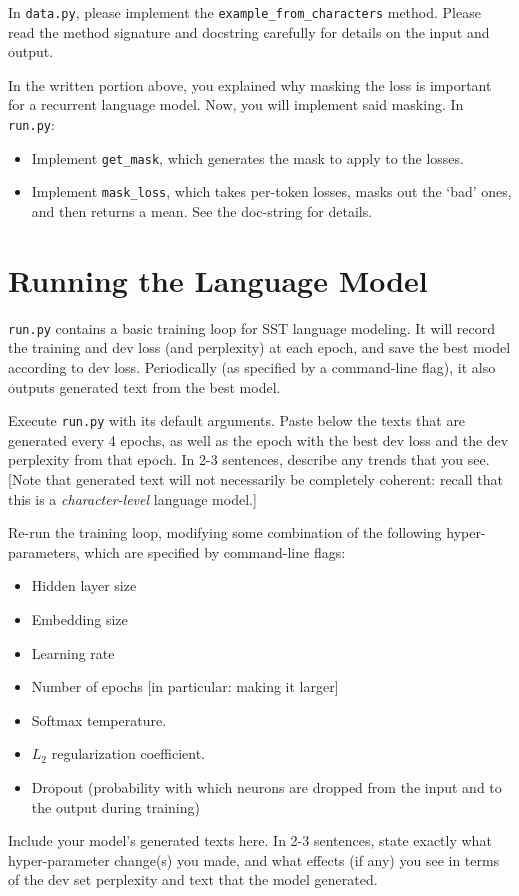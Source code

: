 \documentclass[11pt]{article}
\begin{document}
\noindent In \texttt{data.py}, please implement the \texttt{example\_from\_characters} method.  Please read the method signature and docstring carefully for details on the input and output.


\vspace{2em}
 In the written portion above, you explained why masking the loss is important for a recurrent language model.  Now, you will implement said masking.  In \texttt{run.py}:
\begin{itemize}
  \item Implement \texttt{get\_mask}, which generates the mask to apply to the losses.
  \item Implement \texttt{mask\_loss}, which takes per-token losses, masks out the `bad' ones, and then returns a mean.  See the doc-string for details.
\end{itemize}


\section{Running the Language Model}

\texttt{run.py} contains a basic training loop for SST language modeling. It will record the training and dev loss (and perplexity) at each epoch, and save the best model according to dev loss.  Periodically (as specified by a command-line flag), it also outputs generated text from the best model.

\vspace{2em}
 Execute \texttt{run.py} with its default arguments.  Paste below the texts that are generated every 4 epochs, as well as the epoch with the best dev loss and the dev perplexity from that epoch.  In 2-3 sentences, describe any trends that you see.  [Note that generated text will not necessarily be completely coherent: recall that this is a \emph{character-level} language model.]

\vspace{2em}
 Re-run the training loop, modifying some combination of the following hyper-parameters, which are specified by command-line flags:
\begin{itemize}
  \item Hidden layer size
  \item Embedding size
  \item Learning rate
  \item Number of epochs [in particular: making it larger]
  \item Softmax temperature. 
  \item $L_2$ regularization coefficient.
  \item Dropout (probability with which neurons are dropped from the input and to the output during training)
\end{itemize}
Include your model's generated texts here.  In 2-3 sentences, state exactly what hyper-parameter change(s) you made, and what effects (if any) you see in terms of the dev set perplexity and text that the model generated.
\end{document}

